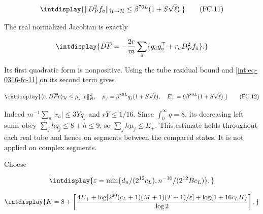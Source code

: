 \begingroup\renewcommand{\theHequation}{intdisplay.704}
\begin{equation}
\intdisplay{
\|D_P^2f_a\|_{\mathcal H\to\mathcal H}
\le\beta^{70L}(1+S\sqrt\ell).
}
\tag{FC.11}
\label{int:eq-0316-fc-11}
\end{equation}
\endgroup


The real normalized Jacobian is exactly


\begingroup\renewcommand{\theHequation}{intdisplay.705}
\begin{equation*}
\intdisplay{
D\overline F=-\frac{2r}{m}\sum_a
\{g_ag_a^\top+r_aD_P^2f_a\}.
}
\end{equation*}
\endgroup


Its first quadratic form is nonpositive. Using the tube residual bound and \eqref{int:eq-0316-fc-11} on its second term gives


\begingroup\renewcommand{\theHequation}{intdisplay.706}
\begin{equation}
\intdisplay{
\langle e,D\overline F e\rangle_{\mathcal H}
\le\mu_j\|e\|_{\mathcal H}^2,
\quad \mu_j=\beta^{80L}q_j(1+S\sqrt\ell),
\quad E_+=9\beta^{80L}(1+S\sqrt\ell).
}
\tag{FC.12}
\label{int:eq-0317-fc-12}
\end{equation}
\endgroup


Indeed \(m^{-1}\sum_a|r_a|\le3Yq_j\) and \(rY\le1/16\). Since \(\int_0^\infty q=8\), its decreasing left sums obey \(\sum_jhq_j\le8+h\le9\), so \(\sum_jh\mu_j\le E_+\). This estimate holds throughout each real tube and hence on segments between the compared states. It is not applied on complex segments.



Choose


\begingroup\renewcommand{\theHequation}{intdisplay.707}
\begin{equation*}
\intdisplay{
\varepsilon=\min\{d_n/(2^{12}c_L),n^{-10}/(2^{12}Bc_L)\},
}
\end{equation*}
\endgroup

\begingroup\renewcommand{\theHequation}{intdisplay.708}
\begin{equation*}
\intdisplay{
K=8+\left\lceil\frac{4E_+
+\log[2^{20}(c_L+1)(M+1)(T+1)/\varepsilon]
+\log(1+16c_LH)}{\log2}\right\rceil,
}
\end{equation*}
\endgroup


